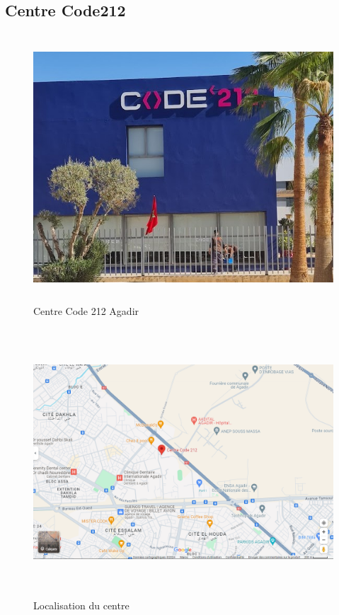 \documentclass[a4paper, 11pt, openany]{report}
\begin{document}
\subsection{Centre Code212}
\begin{figure}[H]
\centering
\includegraphics[height=10cm , width=\textwidth]{code.jpg}
\caption{Centre Code 212 Agadir}
\label{fig:imagecentre}
\end{figure}

\begin{figure}[H]
\centering
\includegraphics[height=10cm , width=\textwidth]{maps.png}
\caption{Localisation du centre}
\label{fig:localisationcentre}
\end{figure}
\end{document}
